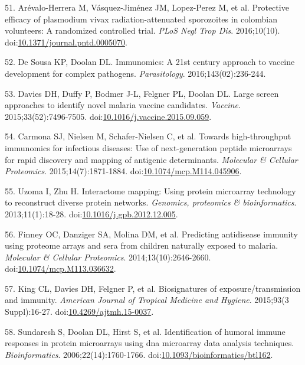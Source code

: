 \documentclass[]{article}
\begin{document}
\hypertarget{ref-arevalo2016spz}{}
51. Arévalo-Herrera M, Vásquez-Jiménez JM, Lopez-Perez M, et al.
Protective efficacy of plasmodium vivax radiation-attenuated sporozoites
in colombian volunteers: A randomized controlled trial. \emph{PLoS Negl
Trop Dis}. 2016;10(10).
doi:\href{https://doi.org/10.1371/journal.pntd.0005070}{10.1371/journal.pntd.0005070}.

\hypertarget{ref-immunomics2016}{}
52. De Sousa KP, Doolan DL. Immunomics: A 21st century approach to
vaccine development for complex pathogens. \emph{Parasitology}.
2016;143(02):236-244.

\hypertarget{ref-Davies2015Large}{}
53. Davies DH, Duffy P, Bodmer J-L, Felgner PL, Doolan DL. Large screen
approaches to identify novel malaria vaccine candidates. \emph{Vaccine}.
2015;33(52):7496-7505.
doi:\href{https://doi.org/10.1016/j.vaccine.2015.09.059}{10.1016/j.vaccine.2015.09.059}.

\hypertarget{ref-carmona2015peptide}{}
54. Carmona SJ, Nielsen M, Schafer-Nielsen C, et al. Towards
high-throughput immunomics for infectious diseases: Use of
next-generation peptide microarrays for rapid discovery and mapping of
antigenic determinants. \emph{Molecular \& Cellular Proteomics}.
2015;14(7):1871-1884.
doi:\href{https://doi.org/10.1074/mcp.M114.045906}{10.1074/mcp.M114.045906}.

\hypertarget{ref-uzoma2013interactome}{}
55. Uzoma I, Zhu H. Interactome mapping: Using protein microarray
technology to reconstruct diverse protein networks. \emph{Genomics,
proteomics \& bioinformatics}. 2013;11(1):18-28.
doi:\href{https://doi.org/10.1016/j.gpb.2012.12.005}{10.1016/j.gpb.2012.12.005}.

\hypertarget{ref-Finney2014}{}
56. Finney OC, Danziger SA, Molina DM, et al. Predicting antidisease
immunity using proteome arrays and sera from children naturally exposed
to malaria. \emph{Molecular \& Cellular Proteomics}.
2014;13(10):2646-2660.
doi:\href{https://doi.org/10.1074/mcp.M113.036632}{10.1074/mcp.M113.036632}.

\hypertarget{ref-King2015FOC}{}
57. King CL, Davies DH, Felgner P, et al. Biosignatures of
exposure/transmission and immunity. \emph{American Journal of Tropical
Medicine and Hygiene}. 2015;93(3 Suppl):16-27.
doi:\href{https://doi.org/10.4269/ajtmh.15-0037}{10.4269/ajtmh.15-0037}.

\hypertarget{ref-sundaresh2006}{}
58. Sundaresh S, Doolan DL, Hirst S, et al. Identification of humoral
immune responses in protein microarrays using dna microarray data
analysis techniques. \emph{Bioinformatics}. 2006;22(14):1760-1766.
doi:\href{https://doi.org/10.1093/bioinformatics/btl162}{10.1093/bioinformatics/btl162}.
\end{document}
